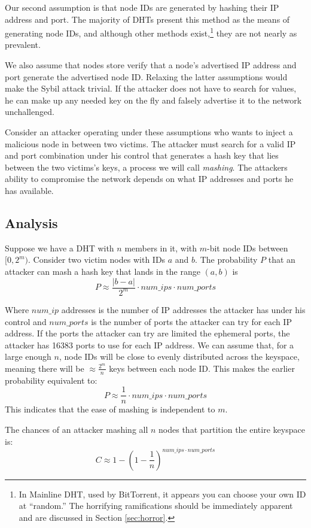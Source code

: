 \documentclass[a4paper]{article}
\begin{document}
Our second assumption is that node IDs are generated by hashing their IP address and port.
The majority of DHTs present this method as the means of generating node IDs, and although other methods exist,\footnote{In Mainline DHT, used by BitTorrent, it appears you can choose your own ID at ``random.''  The horrifying ramifications should be immediately apparent and are discussed in Section \ref{sec:horror}.} they are not nearly as prevalent.

We also assume that nodes store verify that a node's advertised IP address and port generate the advertised node ID. 
Relaxing the latter assumptions would  make the Sybil attack trivial. 
If the attacker does not have to search for values, he can make up any needed key on the fly and falsely advertise it to the network unchallenged.

Consider an attacker operating under these assumptions who wants to inject a malicious node in between two victims.
The attacker must search for a valid IP and port combination under his control that generates a hash key that lies between the two victims's keys, a process we will call \textit{mashing}.
The attackers ability to compromise the network depends on what IP addresses and ports he has available.



\subsection{Analysis}
Suppose we have a DHT with $n$ members in it, with $m$-bit node IDs between $[0,2^{m})$. 
Consider two victim nodes with IDs $a$ and $b$.
The probability $P$ that an attacker can mash a hash key that lands in the range $(a,b)$ is 
$$ P \approx \frac{|b-a|}{2^{m}}\cdot num\_ips \cdot num\_ports  $$

Where $num\_ip$ addresses is the number of IP addresses the attacker has under his control and $num\_ports$ is the number of ports the attacker can try for each IP address.
If the ports the attacker can try are limited the ephemeral ports, the attacker has 16383 ports to use for each IP address.
We can assume that, for a large enough $n$, node IDs will be close to evenly distributed across the keyspace, meaning there will be $\approx \frac{2^{m}}{n}$ keys between each node ID.
This makes the earlier probability equivalent to:
$$ P \approx \frac{1}{n}\cdot num\_ips \cdot num\_ports  $$
This indicates that the ease of mashing is independent to $m$.

The chances of an attacker mashing all $n$ nodes that partition the entire keyspace is:
$$C \approx  1 - (1 -\frac{1}{n})^{num\_ips \cdot num\_ports}  $$
\end{document}
